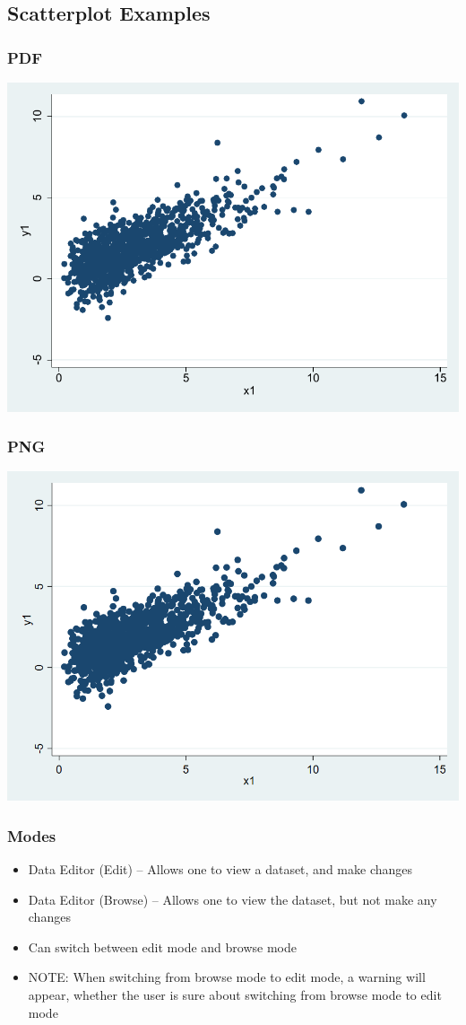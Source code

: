 \documentclass{beamer}
\begin{document}
\subsection{Scatterplot Examples}

\begin{frame}
	\frametitle{PDF}
		\includegraphics[scale=0.7]{DVgraph02a.pdf}
\end{frame}

\begin{frame}
	\frametitle{PNG}
		\includegraphics[scale=0.3]{DVgraph02a.png}
\end{frame}

\begin{frame}
	\frametitle{Modes}
		\begin{itemize}
			\item Data Editor (Edit) -- Allows one to view a dataset, and make changes
			\item Data Editor (Browse) -- Allows one to view the dataset, but not make any changes
			\item Can switch between edit mode and browse mode
			\item NOTE: When switching from browse mode to edit mode, a warning will appear, whether the user is sure about switching from browse mode to edit mode
		\end{itemize}
\end{frame}
\end{document}
